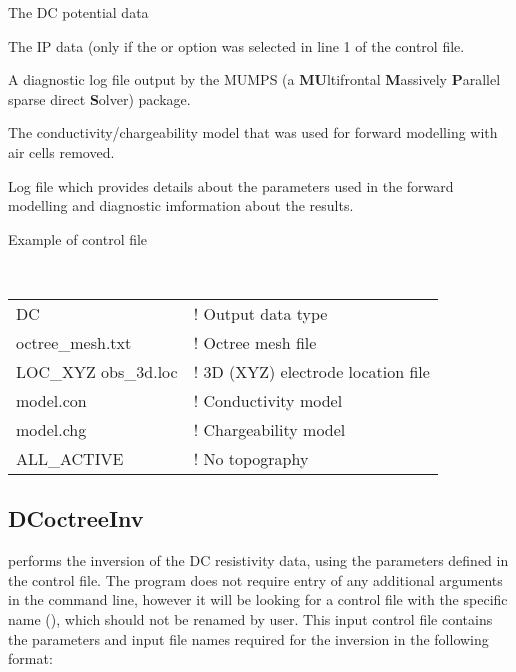 \begin{description}[leftmargin=5cm, style=sameline, align=left]
\item[\fileName{data\_dc.txt}] The DC potential data
\item[\fileName{data\_ip.txt}] The IP data (only if the  or  option was selected in line 1 of the control file.
\item[\fileName{mumps.txt}] A diagnostic log file output by the MUMPS (a \textbf{MU}ltifrontal \textbf{M}assively \textbf{P}arallel sparse direct \textbf{S}olver) package.
\item[\fileName{model0.(con/chg)}] The conductivity/chargeability model that was used for forward modelling with air cells removed.
\item[\fileName{DCIP\_octree\_fwd.txt}] Log file which provides details about the parameters used in the forward modelling and diagnostic imformation about the results.
\end{description} 

Example of  control file

\begin{fileExample}\
\begin{tabular}{|ll|}
\hline
DC & ! Output data type \\
octree\_mesh.txt & ! Octree mesh file \\
LOC\_XYZ obs\_3d.loc & ! 3D (XYZ) electrode location file\\
model.con & ! Conductivity model\\
model.chg & ! Chargeability model\\
ALL\_ACTIVE & ! No topography\\
\hline
\end{tabular}
\end{fileExample}


\subsection{DCoctreeInv}

 performs the inversion of the DC resistivity data, using the parameters defined in the control file. The program does not require entry of any additional arguments in the command line, however it will be looking for a control file with the specific name (), which should not be renamed by user. This input control file contains the parameters and input file names required for the inversion in the following format:

